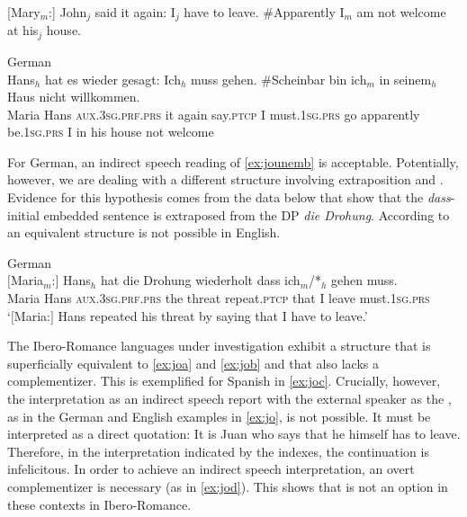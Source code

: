 \ea \label{ex:jounem}
\ea\label{ex:jounema} [Mary$_m$:] John$_j$ said it again: I$_j$ have to leave. \#Apparently I$_m$ am not welcome at his$_j$ house.

\ex\label{ex:jounemb}
German\\
\gll [Maria$_m$:] Hans$_h$ hat es wieder gesagt:  Ich$_h$ muss gehen. \#Scheinbar bin ich$_m$ in seinem$_h$ Haus nicht willkommen. \\
Maria Hans  \textsc{aux.3sg.prf.prs} it again say.\textsc{ptcp} I must.\textsc{1sg.prs} go apparently be.\textsc{1sg.prs} I in his house not welcome\\
\z
\z

For German, an indirect speech reading of \eqref{ex:jounemb} is acceptable. Potentially, however, we are dealing with a different structure involving  extraposition and . Evidence for this hypothesis comes from the data below that show that the \emph{dass}-initial embedded sentence is extraposed from the DP \emph{die Drohung}. According to \citet{Bianchi2017} an equivalent  structure is not possible in English.

\ea
German\\
\gll $[$Maria$_m$:$]$ Hans$_h$ hat die Drohung wiederholt dass ich$_m$/*$_h$ gehen muss. \\
Maria Hans \textsc{aux.3sg.prf.prs} the threat repeat.\textsc{ptcp} that I  leave must.\textsc{1sg.prs}\\
\glt `$[$Maria:$]$ Hans repeated his threat by saying that I have to leave.'
\z 

The Ibero-Romance languages under investigation  exhibit a structure that is superficially equivalent to \eqref{ex:joa} and \eqref{ex:job} and that also lacks a complementizer. This is exemplified for Spanish in \eqref{ex:joc}. Crucially, however, the interpretation as an indirect speech report  with the external speaker as the , as in the German and English examples in \eqref{ex:jo}, is not possible. It must be interpreted as a direct quotation: It is Juan who says  that he himself has to leave. Therefore, in the interpretation indicated by the indexes,  the continuation is  infelicitous. In order to achieve an indirect speech interpretation,  an overt complementizer is necessary (as in  \ref{ex:jod}). This shows that    is not an option in these contexts in Ibero-Romance.

